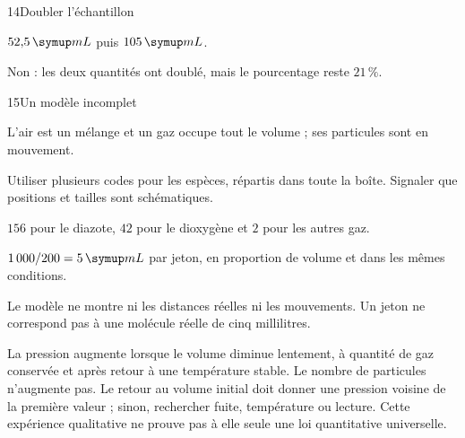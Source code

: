 \par\noindent\begin{minipage}{\linewidth}
\begin{corrige}{14}{Doubler l’échantillon}
\begin{questions}
\item $52{,}5\unite{mL}$ puis $105\unite{mL}$.
\item Non : les deux quantités ont doublé, mais le pourcentage reste $21\,\%$.
\end{questions}
\end{corrige}
\end{minipage}
\par\noindent\begin{minipage}{\linewidth}
\begin{corrige}{15}{Un modèle incomplet}
\begin{questions}
\item L’air est un mélange et un gaz occupe tout le volume ; ses particules sont en mouvement.
\item Utiliser plusieurs codes pour les espèces, répartis dans toute la boîte. Signaler que positions et tailles sont schématiques.
\end{questions}
\end{corrige}
\end{minipage}
\par\noindent\begin{minipage}{\linewidth}
\label{cor-defi-2}\begin{questions}
\item $156$ pour le diazote, $42$ pour le dioxygène et $2$ pour les autres gaz.
\item $1\,000/200=5\unite{mL}$ par jeton, en proportion de volume et dans les mêmes conditions.
\item Le modèle ne montre ni les distances réelles ni les mouvements. Un jeton ne correspond pas à une molécule réelle de cinq millilitres.
\end{questions}
\end{minipage}
\par\noindent\begin{minipage}{\linewidth}
\label{cor-activite-2}
La pression augmente lorsque le volume diminue lentement, à quantité de gaz conservée et après retour à une température stable. Le nombre de particules n’augmente pas. Le retour au volume initial doit donner une pression voisine de la première valeur ; sinon, rechercher fuite, température ou lecture. Cette expérience qualitative ne prouve pas à elle seule une loi quantitative universelle.\par\end{minipage}
